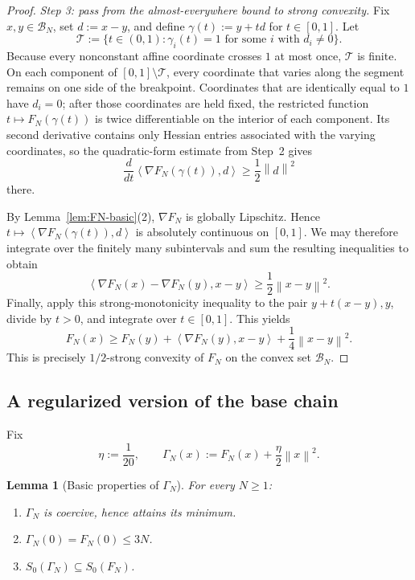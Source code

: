 \documentclass[11pt]{article}
\newtheorem{lemma}[theorem]{Lemma}
\newcommand{\norm}[1]{\left\lVert #1\right\rVert}
\newcommand{\ip}[2]{\left\langle #1,#2\right\rangle}
\begin{document}
\begin{proof}
\emph{Step 3: pass from the almost-everywhere bound to strong convexity.}
Fix \(x,y\in\mathcal B_N\), set \(d:=x-y\), and define
\(\gamma(t):=y+td\) for \(t\in[0,1]\). Let
\[
\mathcal T
:=
\bigl\{t\in(0,1):\gamma_i(t)=1\text{ for some }i\text{ with }d_i\ne0\bigr\}.
\]
Because every nonconstant affine coordinate crosses \(1\) at most once, \(\mathcal T\) is finite. On each component
of \([0,1]\setminus\mathcal T\), every coordinate that varies along the segment remains on one side of the breakpoint.
Coordinates that are identically equal to \(1\) have \(d_i=0\); after those coordinates are held fixed, the restricted
function \(t\mapsto F_N(\gamma(t))\) is twice differentiable on the interior of each component. Its second derivative
contains only Hessian entries associated with the varying coordinates, so the quadratic-form estimate from Step~2
gives
\[
\frac{d}{dt}\ip{\nabla F_N(\gamma(t))}{d}
\ge
\frac12\norm{d}^2
\]
there.

By Lemma~\ref{lem:FN-basic}(2), \(\nabla F_N\) is globally Lipschitz. Hence
\(t\mapsto\ip{\nabla F_N(\gamma(t))}{d}\) is absolutely continuous on \([0,1]\). We may therefore integrate over the
finitely many subintervals and sum the resulting inequalities to obtain
\[
\ip{\nabla F_N(x)-\nabla F_N(y)}{x-y}
\ge
\frac12\norm{x-y}^2.
\]
Finally, apply this strong-monotonicity inequality to the pair \(y+t(x-y),y\), divide by \(t>0\), and integrate over
\(t\in[0,1]\). This yields
\[
F_N(x)
\ge
F_N(y)+\ip{\nabla F_N(y)}{x-y}
+\frac14\norm{x-y}^2.
\]
This is precisely \(1/2\)-strong convexity of \(F_N\) on the convex set \(\mathcal B_N\).
\end{proof}

\subsection{A regularized version of the base chain}
\label{app:sto-regularized}

Fix
\[
\eta:=\frac{1}{20},
\qquad
\Gamma_N(x):=F_N(x)+\frac{\eta}{2}\norm{x}^2.
\]

\begin{lemma}[Basic properties of $\Gamma_N$]
\label{lem:Gamma-basic}
For every $N\ge 1$:
\begin{enumerate}[label=\arabic*.,leftmargin=1.5em]
    \item $\Gamma_N$ is coercive, hence attains its minimum.
    \item $\Gamma_N(0)=F_N(0)\le 3N$.
    \item $S_0(\Gamma_N)\subseteq S_0(F_N)$.
\end{enumerate}
\end{lemma}
\end{document}
